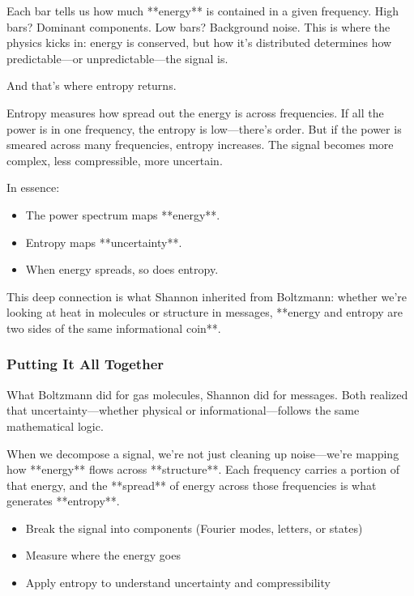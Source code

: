 Each bar tells us how much **energy** is contained in a given frequency. High bars? Dominant components. Low bars? Background noise. This is where the physics kicks in: energy is conserved, but how it’s distributed determines how predictable—or unpredictable—the signal is.

And that’s where entropy returns.

Entropy measures how spread out the energy is across frequencies. If all the power is in one frequency, the entropy is low—there’s order. But if the power is smeared across many frequencies, entropy increases. The signal becomes more complex, less compressible, more uncertain.

In essence:
\begin{itemize}
  \item The power spectrum maps **energy**.
  \item Entropy maps **uncertainty**.
  \item When energy spreads, so does entropy.
\end{itemize}

This deep connection is what Shannon inherited from Boltzmann: whether we're looking at heat in molecules or structure in messages, **energy and entropy are two sides of the same informational coin**.


\subsubsection{Putting It All Together}

What Boltzmann did for gas molecules, Shannon did for messages. Both realized that uncertainty—whether physical or informational—follows the same mathematical logic. 

When we decompose a signal, we’re not just cleaning up noise—we’re mapping how **energy** flows across **structure**. Each frequency carries a portion of that energy, and the **spread** of energy across those frequencies is what generates **entropy**.

\begin{itemize}
  \item Break the signal into components (Fourier modes, letters, or states)
  \item Measure where the energy goes
  \item Apply entropy to understand uncertainty and compressibility
\end{itemize}


